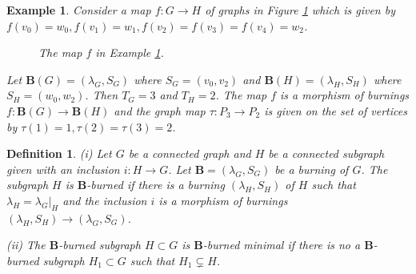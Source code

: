 \documentclass[a4paper, 11pt]{article}
\newtheorem{definition}[theorem]{Definition}
\newtheorem{example}[theorem]{Example}
\begin{document}
\begin{example}\label{e3.19} \rm Consider a map $f\colon G\to H$ of graphs in Figure \ref{map1} which is given by $f(v_0)=w_0, f(v_1)=w_1, f(v_2)=f(v_3)=f(v_4)=w_2$.
\begin{figure}[H]
\centering
{}
  \caption{The map $f$ in Example \ref{e3.19}.}
\label{map1}
\end{figure}
Let  $\mathbf B(G)=(\lambda_G, S_G)$ where $S_G=(v_0, v_2)$ and $\mathbf B(H)=(\lambda_H, S_H)$ where $S_H=(w_0, w_2)$. Then $T_G=3$ and $T_H=2$. The map $f$ is a morphism of burnings $f\colon \mathbf B(G)\to \mathbf B(H)$ and the  graph map   $\tau\colon P_3\to P_2$ is given on the set of vertices by $\tau(1)=1, \tau(2)=\tau(3)=2$. 
\end{example} 

\begin{definition}\label{d3.20} \rm (i) Let  $G$ be a connected graph   and $H$ be a   connected subgraph  given with an inclusion $ i\colon H\to G$. Let $\mathbf B=(\lambda_G, S_G)$ be a burning of $G$.   The \emph{subgraph $H$ is $\mathbf B$-burned}  if there is a burning $(\lambda_H, S_H)$ of $H$ such that  $\lambda_H=\lambda_G|_{H}$ and the inclusion $i$ is a morphism of burnings 
$ (\lambda_H, S_H) \to (\lambda_G, S_G)$. 

(ii) The $\mathbf B$-burned  subgraph $H\subset G$ is \emph{$\mathbf B$-burned minimal}  if there is no a $\mathbf B$-burned subgraph $H_1\subset G$ such that  $H_1\varsubsetneq H$.  
\end{definition} 
\end{document}
